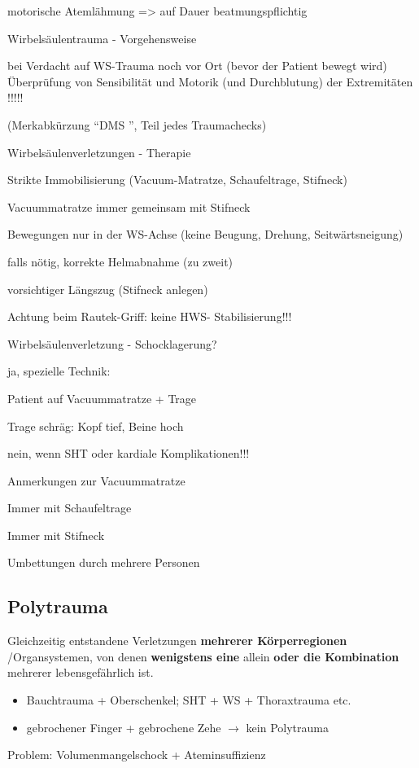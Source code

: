 \documentclass{article}
\newcommand\gEs[1]{\textbf{\textcolor[rgb]{0.0,0.0,0.5019608}{#1}}}
\newcommand\gEs[1]{\textbf{\textcolor[rgb]{0.0,0.0,0.5019608}{#1}}}
\begin{document}
{\mdseries
motorische Ateml\"ahmung ={\textgreater} auf Dauer  beatmungspflichtig}

{\mdseries\color{black}
Wirbels\"aulentrauma -  Vorgehensweise}

{\mdseries
bei Verdacht  auf WS-Trauma  noch vor Ort  (bevor  der Patient bewegt 
wird) \"Uberpr\"ufung von Sensibilit\"at  und Motorik (und
Durchblutung) der Extremit\"aten !!!!!}

{\mdseries
(Merkabk\"urzung {\textquotedblleft}DMS {\textquotedblright}, Teil jedes
 Traumachecks)}

{\mdseries
Wirbels\"aulenverletzungen - Therapie}

{\mdseries
Strikte Immobilisierung (Vacuum-Matratze, Schaufeltrage, Stifneck)}

{\mdseries
Vacuummatratze immer gemeinsam mit  Stifneck}

{\mdseries
Bewegungen nur in der WS-Achse (keine  Beugung, Drehung,
Seitw\"artsneigung)}

{\mdseries
falls n\"otig, korrekte Helmabnahme (zu  zweit)}

{\mdseries
vorsichtiger L\"angszug (Stifneck anlegen)}

{\mdseries
Achtung beim Rautek-Griff: keine HWS- Stabilisierung!!!}

{\mdseries
Wirbels\"aulenverletzung -  Schocklagerung?}

{\mdseries
ja, spezielle Technik:}

{\mdseries
Patient auf Vacuummatratze + Trage}

{\mdseries
Trage schr\"ag: Kopf tief, Beine hoch}

{\mdseries
nein, wenn SHT oder kardiale  Komplikationen!!!}

{\mdseries\color{black}
Anmerkungen zur Vacuummatratze}

{\mdseries
Immer mit Schaufeltrage}

{\mdseries
Immer mit Stifneck}

{\mdseries
Umbettungen durch mehrere Personen}

\subsection{Polytrauma}
{\mdseries
Gleichzeitig entstandene Verletzungen \gEs{mehrerer
K\"orperregionen} /Organsystemen, von  denen
\gEs{wenigstens eine} allein
\gEs{oder die Kombination} mehrerer
lebensgef\"ahrlich  ist.}

\begin{itemize}
\item {\mdseries
Bauchtrauma + Oberschenkel; SHT + WS + Thoraxtrauma etc.}

\item {\mdseries
gebrochener Finger + gebrochene Zehe ${\rightarrow}$ kein Polytrauma}

\end{itemize}
{\mdseries
Problem:  Volumenmangelschock +  Ateminsuffizienz}
\end{document}
